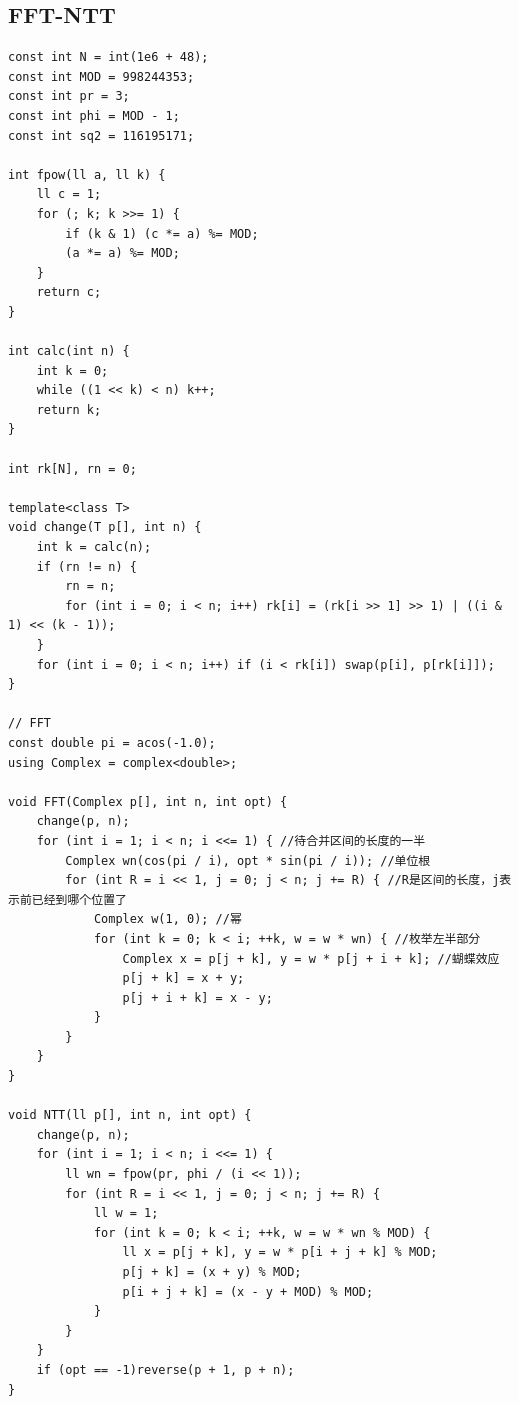 \documentclass[twoside]{article}
\begin{document}
\subsection{FFT-NTT}
\begin{lstlisting}
const int N = int(1e6 + 48);
const int MOD = 998244353;
const int pr = 3;
const int phi = MOD - 1;
const int sq2 = 116195171; 

int fpow(ll a, ll k) {
    ll c = 1;
    for (; k; k >>= 1) {
        if (k & 1) (c *= a) %= MOD;
        (a *= a) %= MOD;
    }
    return c;
}

int calc(int n) {
    int k = 0;
    while ((1 << k) < n) k++;
    return k;
}

int rk[N], rn = 0;

template<class T>
void change(T p[], int n) {
    int k = calc(n);
    if (rn != n) {
        rn = n;
        for (int i = 0; i < n; i++) rk[i] = (rk[i >> 1] >> 1) | ((i & 1) << (k - 1));
    }
    for (int i = 0; i < n; i++) if (i < rk[i]) swap(p[i], p[rk[i]]);
}

// FFT
const double pi = acos(-1.0);
using Complex = complex<double>;

void FFT(Complex p[], int n, int opt) {
    change(p, n);
    for (int i = 1; i < n; i <<= 1) { //待合并区间的长度的一半
        Complex wn(cos(pi / i), opt * sin(pi / i)); //单位根
        for (int R = i << 1, j = 0; j < n; j += R) { //R是区间的长度，j表示前已经到哪个位置了
            Complex w(1, 0); //幂
            for (int k = 0; k < i; ++k, w = w * wn) { //枚举左半部分
                Complex x = p[j + k], y = w * p[j + i + k]; //蝴蝶效应
                p[j + k] = x + y;
                p[j + i + k] = x - y;
            }
        }
    }
}

void NTT(ll p[], int n, int opt) {
    change(p, n);
    for (int i = 1; i < n; i <<= 1) {
        ll wn = fpow(pr, phi / (i << 1));
        for (int R = i << 1, j = 0; j < n; j += R) {
            ll w = 1;
            for (int k = 0; k < i; ++k, w = w * wn % MOD) {
                ll x = p[j + k], y = w * p[i + j + k] % MOD;
                p[j + k] = (x + y) % MOD;
                p[i + j + k] = (x - y + MOD) % MOD;
            }
        }
    }
    if (opt == -1)reverse(p + 1, p + n);
}\end{lstlisting}
\end{document}
